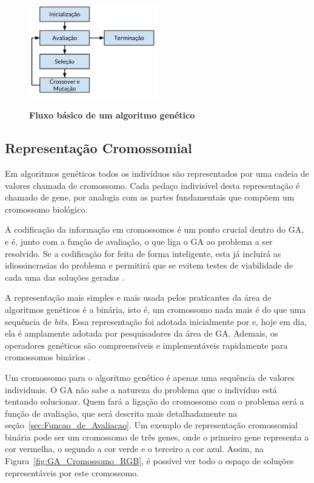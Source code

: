 \documentclass[12pt,oneside,a4paper,english,french,spanish,brazil,]{abntex2}
\begin{document}
\begin{figure}[ht]
\centering
\caption{\textbf{Fluxo básico de um algoritmo genético}}
\includegraphics[width=0.5\textwidth]{imagens/GA_Fluxo.pdf}
\label{fig:GA_Fluxo}
\end{figure}

\subsection{Representação Cromossomial}

Em algoritmos genéticos todos os indivíduos são representados por uma cadeia de valores chamada de cromossomo. Cada pedaço indivisível desta representação é chamado de gene, por analogia com as partes fundamentais que compõem um cromossomo biológico.

A codificação da informação em cromossomos é um ponto crucial dentro do GA, e é, junto com a função de avaliação, o que liga o GA ao problema a ser resolvido. Se a codificação for feita de forma inteligente, esta já incluirá as idiossincrasias do problema e permitirá que se evitem testes de viabilidade de cada uma das soluções geradas \cite{linden:2008}.

A representação mais simples e mais usada pelos praticantes da área de algoritmos genéticos é a binária, isto é, um cromossomo nada mais é do que uma sequência de \textit{bits}. Essa representação foi adotada inicialmente por \citet{holland:1992} e, hoje em dia, ela é amplamente adotada por pesquisadores da área de GA. Ademais, os operadores genéticos são compreensíveis e implementáveis rapidamente para cromossomos binários \cite{linden:2008}.

Um cromossomo para o algoritmo genético é apenas uma sequência de valores individuais. O GA não sabe a natureza do problema que o indivíduo está tentando solucionar. Quem fará a ligação do cromossomo com o problema será a função de avaliação, que será descrita mais detalhadamente na seção~\ref{sec:Funcao_de_Avaliacao}. Um exemplo de representação cromossomial binária pode ser um cromossomo de três genes, onde o primeiro gene representa a cor vermelha, o segundo a cor verde e o terceiro a cor azul. Assim, na Figura~\ref{fig:GA_Cromossomo_RGB}, é possível ver todo o espaço de soluções representáveis por este cromossomo.
\end{document}

